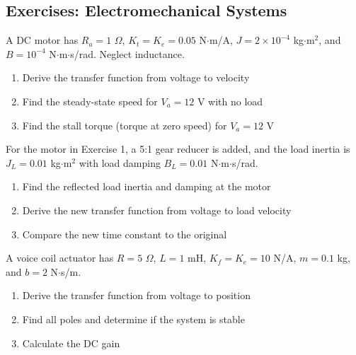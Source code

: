 \subsection{Exercises: Electromechanical Systems}

\begin{exercise}
A DC motor has $R_a = 1$ $\Omega$, $K_t = K_e = 0.05$ N$\cdot$m/A, $J = 2 \times 10^{-4}$ kg$\cdot$m$^2$, and $B = 10^{-4}$ N$\cdot$m$\cdot$s/rad. Neglect inductance.
\begin{enumerate}[label=(\alph*)]
    \item Derive the transfer function from voltage to velocity
    \item Find the steady-state speed for $V_a = 12$ V with no load
    \item Find the stall torque (torque at zero speed) for $V_a = 12$ V
\end{enumerate}
\end{exercise}

\begin{exercise}
For the motor in Exercise 1, a 5:1 gear reducer is added, and the load inertia is $J_L = 0.01$ kg$\cdot$m$^2$ with load damping $B_L = 0.01$ N$\cdot$m$\cdot$s/rad.
\begin{enumerate}[label=(\alph*)]
    \item Find the reflected load inertia and damping at the motor
    \item Derive the new transfer function from voltage to load velocity
    \item Compare the new time constant to the original
\end{enumerate}
\end{exercise}

\begin{exercise}
A voice coil actuator has $R = 5$ $\Omega$, $L = 1$ mH, $K_f = K_e = 10$ N/A, $m = 0.1$ kg, and $b = 2$ N$\cdot$s/m.
\begin{enumerate}[label=(\alph*)]
    \item Derive the transfer function from voltage to position
    \item Find all poles and determine if the system is stable
    \item Calculate the DC gain
\end{enumerate}
\end{exercise}

